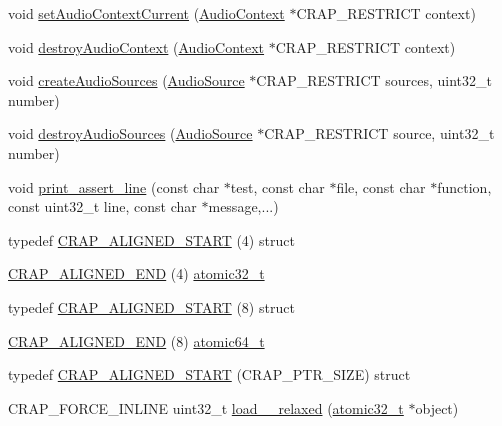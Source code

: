 \begin{DoxyCompactItemize}
\item 
void \hyperlink{namespacecrap_af82fa263b7c572b66b3f94e04064bc34}{set\+Audio\+Context\+Current} (\hyperlink{namespacecrap_a4d9ca11977af369032d36460bc1c80e7}{Audio\+Context} $\ast$C\+R\+A\+P\+\_\+\+R\+E\+S\+T\+R\+I\+C\+T context)
\item 
void \hyperlink{namespacecrap_a66c9a3908f68d40686a473ea0f7faeae}{destroy\+Audio\+Context} (\hyperlink{namespacecrap_a4d9ca11977af369032d36460bc1c80e7}{Audio\+Context} $\ast$C\+R\+A\+P\+\_\+\+R\+E\+S\+T\+R\+I\+C\+T context)
\item 
void \hyperlink{namespacecrap_a554f66d5aba30c378aca3ad8a10f359e}{create\+Audio\+Sources} (\hyperlink{namespacecrap_a462d678db37c6a434145136ab6d59720}{Audio\+Source} $\ast$C\+R\+A\+P\+\_\+\+R\+E\+S\+T\+R\+I\+C\+T sources, uint32\+\_\+t number)
\item 
void \hyperlink{namespacecrap_a7032ad7bf15803aae858c29d787e09bb}{destroy\+Audio\+Sources} (\hyperlink{namespacecrap_a462d678db37c6a434145136ab6d59720}{Audio\+Source} $\ast$C\+R\+A\+P\+\_\+\+R\+E\+S\+T\+R\+I\+C\+T source, uint32\+\_\+t number)
\item 
void \hyperlink{namespacecrap_a5af0b5a586764352edd662c58a5d6c68}{print\+\_\+assert\+\_\+line} (const char $\ast$test, const char $\ast$file, const char $\ast$function, const uint32\+\_\+t line, const char $\ast$message,...)
\item 
typedef \hyperlink{namespacecrap_aa4db5c324bca7af9040282ebca5db226}{C\+R\+A\+P\+\_\+\+A\+L\+I\+G\+N\+E\+D\+\_\+\+S\+T\+A\+R\+T} (4) struct
\item 
\hyperlink{namespacecrap_a40f2b73ae646e41f3534198d19fbb188}{C\+R\+A\+P\+\_\+\+A\+L\+I\+G\+N\+E\+D\+\_\+\+E\+N\+D} (4) \hyperlink{structcrap_1_1atomic32__t}{atomic32\+\_\+t}
\item 
typedef \hyperlink{namespacecrap_a35a4179ff2d8be49b4b8fd4d9c8cd214}{C\+R\+A\+P\+\_\+\+A\+L\+I\+G\+N\+E\+D\+\_\+\+S\+T\+A\+R\+T} (8) struct
\item 
\hyperlink{namespacecrap_a50430530738a8b5e14eb5cf710bab3d7}{C\+R\+A\+P\+\_\+\+A\+L\+I\+G\+N\+E\+D\+\_\+\+E\+N\+D} (8) \hyperlink{structcrap_1_1atomic64__t}{atomic64\+\_\+t}
\item 
typedef \hyperlink{namespacecrap_a184e33bb76ffda80cf31d0d82d0ac126}{C\+R\+A\+P\+\_\+\+A\+L\+I\+G\+N\+E\+D\+\_\+\+S\+T\+A\+R\+T} (C\+R\+A\+P\+\_\+\+P\+T\+R\+\_\+\+S\+I\+Z\+E) struct
\item 
C\+R\+A\+P\+\_\+\+F\+O\+R\+C\+E\+\_\+\+I\+N\+L\+I\+N\+E uint32\+\_\+t \hyperlink{namespacecrap_a52611b7c31e450c50c5afa9debc2c0e7}{load\+\_\+\_\+relaxed} (\hyperlink{structcrap_1_1atomic32__t}{atomic32\+\_\+t} $\ast$object)

\end{DoxyCompactItemize}
